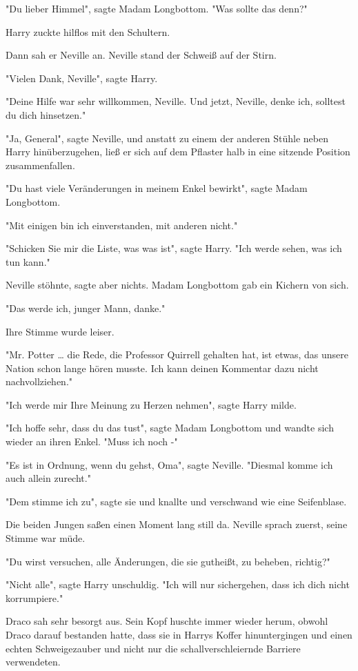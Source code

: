 {"Du lieber Himmel", sagte Madam Longbottom. "Was sollte das denn?"

Harry zuckte hilflos mit den Schultern.

Dann sah er Neville an. Neville stand der Schweiß auf der Stirn.

"Vielen Dank, Neville", sagte Harry.

"Deine Hilfe war sehr willkommen, Neville. Und jetzt, Neville, denke ich, solltest du dich hinsetzen."

"Ja, General", sagte Neville, und anstatt zu einem der anderen Stühle neben Harry hinüberzugehen, ließ er sich auf dem Pflaster halb in eine sitzende Position zusammenfallen.

"Du hast viele Veränderungen in meinem Enkel bewirkt", sagte Madam Longbottom.

"Mit einigen bin ich einverstanden, mit anderen nicht."

"Schicken Sie mir die Liste, was was ist", sagte Harry. "Ich werde sehen, was ich tun kann."

Neville stöhnte, sagte aber nichts. Madam Longbottom gab ein Kichern von sich.

"Das werde ich, junger Mann, danke."

Ihre Stimme wurde leiser.

"Mr. Potter … die Rede, die Professor Quirrell gehalten hat, ist etwas, das unsere Nation schon lange hören musste. Ich kann deinen Kommentar dazu nicht nachvollziehen."

"Ich werde mir Ihre Meinung zu Herzen nehmen", sagte Harry milde.

"Ich hoffe sehr, dass du das tust", sagte Madam Longbottom und wandte sich wieder an ihren Enkel. "Muss ich noch -"

"Es ist in Ordnung, wenn du gehst, Oma", sagte Neville. "Diesmal komme ich auch allein zurecht."

"Dem stimme ich zu", sagte sie und knallte und verschwand wie eine Seifenblase.

Die beiden Jungen saßen einen Moment lang still da. Neville sprach zuerst, seine Stimme war müde.

"Du wirst versuchen, alle Änderungen, die sie gutheißt, zu beheben, richtig?"

"Nicht alle", sagte Harry unschuldig. "Ich will nur sichergehen, dass ich dich nicht korrumpiere."

Draco sah sehr besorgt aus. Sein Kopf huschte immer wieder herum, obwohl Draco darauf bestanden hatte, dass sie in Harrys Koffer hinuntergingen und einen echten Schweigezauber und nicht nur die schallverschleiernde Barriere verwendeten.

}
